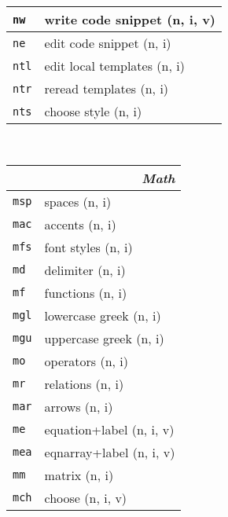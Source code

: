 \documentclass[oneside,10pt,landscape,DIV17]{scrartcl}
\newcommand{\Map}[1] {\textbf{\textasciiacute}\texttt{#1}}
\begin{document}
\begin{multicols}{3}
\begin{center}
\begin{tabular}[]{|p{11mm}|p{60mm}|}
\hline \Map{nw}  & write code snippet        \hfill (n, i, v)\\
\hline \Map{ne}  & edit code snippet         \hfill (n, i)   \\
\hline
\hline \Map{ntl} & edit local templates      \hfill (n, i)   \\
\hline \Map{ntr} & reread templates          \hfill (n, i)   \\
\hline \Map{nts} & choose style              \hfill (n, i)   \\
\hline
%
\end{tabular}\\
%
\begin{tabular}[]{|p{11mm}|p{62mm}|}
\hline
\multicolumn{2}{|r|}{\textsl{\textbf{M}ath}}  \\[1.0ex]
\hline  \Map{msp} & spaces                    \hfill (n, i)\\
\hline  \Map{mac} & accents                   \hfill (n, i)\\
\hline  \Map{mfs} & font styles               \hfill (n, i)\\
\hline  \Map{md}  & delimiter                 \hfill (n, i)\\
\hline  \Map{mf}  & functions                 \hfill (n, i)\\
\hline  \Map{mgl} & lowercase  greek          \hfill (n, i)\\
\hline  \Map{mgu} & uppercase greek           \hfill (n, i)\\
\hline  \Map{mo}  & operators                 \hfill (n, i)\\
\hline  \Map{mr}  & relations                 \hfill (n, i)\\
\hline  \Map{mar} & arrows                    \hfill (n, i)\\
\hline
\hline  \Map{me}  & equation+label            \hfill (n, i, v)\\
\hline  \Map{mea} & eqnarray+label            \hfill (n, i, v)\\
\hline  \Map{mm}  & matrix                    \hfill (n, i)\\
\hline
\hline  \Map{mch} & choose                    \hfill (n, i, v)\\

\end{tabular}
\end{center}
\end{multicols}
\end{document}
